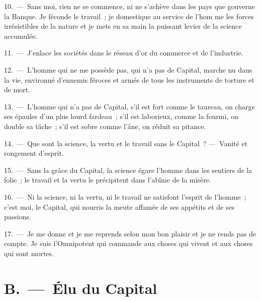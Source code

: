 \documentclass[french,twoside]{book} %
\begin{document}
10. — Sans moi, rien ne se commence, ni ne s’achève dans les pays que gouverne la Banque. Je féconde le travail ; je domestique au service de l’hom me les forces irrésistibles de la nature et je mets en sa main la puissant levier de la science accumulée.\par
11. — J'enlace les sociétés dans le réseau d’or du commerce et de l’industrie.\par
12. — L'homme qui ne me possède pas, qui n’a pas de Capital, marche nu dans la vie, environné d’ennemis féroces et armés de tous les instruments de torture et de mort.\par
13. — L'homme qui n’a pas de Capital, s’il est fort comme le taureau, on charge ses épaules d’un plus lourd fardeau ; s’il est laborieux, comme la fourmi, on double sa tâche ; s’il est sobre comme l’âne, on réduit sa pitance.\par
14. — Que sont la science, la vertu et le travail sans le Capital ? — Vanité et rongement d’esprit.\par
15. — Sans la grâce du Capital, la science égare l’homme dans les sentiers de la folie ; le travail et la vertu le précipitent dans l’abîme de la misère.\par
16. — Ni la science, ni la vertu, ni le travail ne satisfont l’esprit de l’homme ; c’est moi, le Capital, qui nourris la meute affamée de ses appétits et de ses passions.\par
17. — Je me donne et je me reprends selon mon bon plaisir et je ne rends pas de compte. Je suis l’Omnipotent qui commande aux choses qui vivent et aux choses qui sont mortes.

\section[{B. — Élu du Capital}]{B. — Élu du Capital}
\end{document}
